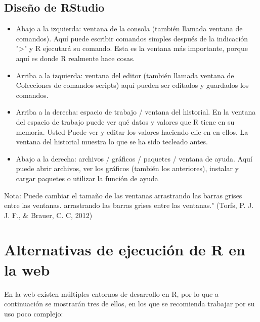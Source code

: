 \documentclass{article}
\begin{document}
{\subsection{Diseño de RStudio}
\begin{itemize}
    \item Abajo a la izquierda: ventana de la consola (también llamada ventana de comandos). Aquí puede escribir comandos simples después de la indicación ">" y R ejecutará su comando. Esta es la ventana más importante, porque aquí es donde R realmente hace cosas.
    \item Arriba a la izquierda: ventana del editor (también llamada ventana de Colecciones de comandos scripts) aquí pueden ser editados y guardados los comandos.
    \item Arriba a la derecha: espacio de trabajo / ventana del historial. En la ventana del espacio de trabajo puede ver qué datos y valores que R tiene en su memoria. Usted Puede ver y editar los valores haciendo clic en en ellos. La ventana del historial muestra lo que se ha sido tecleado antes.
    \item Abajo a la derecha: archivos / gráficos / paquetes / ventana de ayuda. Aquí puede abrir archivos, ver los gráficos (también los anteriores), instalar y cargar paquetes o utilizar la función de ayuda
\end{itemize}

Nota: Puede cambiar el tamaño de las ventanas arrastrando las barras grises entre las ventanas.
arrastrando las barras grises entre las ventanas."  (Torfs, P. J. J. F., & Brauer, C. C, 2012)
}
\newpage
\section{Alternativas de ejecución de R en la web}
En la web existen múltiples entornos de desarrollo en R, por lo que a continuación se mostrarán tres de ellos, en los que se recomienda trabajar por su uso poco complejo:
\end{document}
